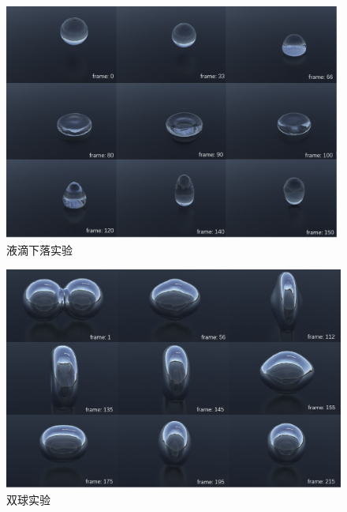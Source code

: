 \begin{figure}[htbp]
    \centering
    \includegraphics[scale=0.56]{./images/DropNotSplashEXP.png}
    \caption[液滴下落实验]{液滴下落实验}
    \label{fig: sphere Drop experience}
\end{figure}

\begin{figure}[htbp]
    \centering
    \includegraphics[scale=0.56]{./images/DoubleSphere.png}
    \caption[双球实验]{双球实验}
    \label{fig: double sphere experience}
\end{figure}

